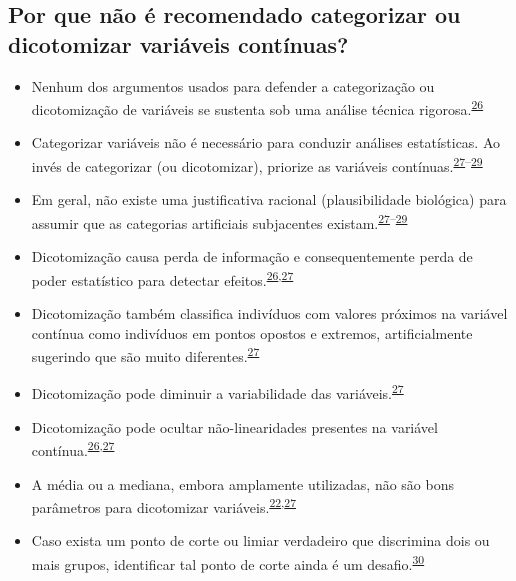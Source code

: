 \documentclass[
]{book}
\begin{document}
\hypertarget{por-que-nuxe3o-uxe9-recomendado-categorizar-ou-dicotomizar-variuxe1veis-contuxednuas}{%
\subsection{Por que não é recomendado categorizar ou dicotomizar variáveis contínuas?}\label{por-que-nuxe3o-uxe9-recomendado-categorizar-ou-dicotomizar-variuxe1veis-contuxednuas}}

\begin{itemize}
\item
  Nenhum dos argumentos usados para defender a categorização ou dicotomização de variáveis se sustenta sob uma análise técnica rigorosa.\textsuperscript{\protect\hyperlink{ref-MacCallum2002}{26}}
\item
  Categorizar variáveis não é necessário para conduzir análises estatísticas. Ao invés de categorizar (ou dicotomizar), priorize as variáveis contínuas.\textsuperscript{\protect\hyperlink{ref-Altman2006}{27}--\protect\hyperlink{ref-Collins2016}{29}}
\item
  Em geral, não existe uma justificativa racional (plausibilidade biológica) para assumir que as categorias artificiais subjacentes existam.\textsuperscript{\protect\hyperlink{ref-Altman2006}{27}--\protect\hyperlink{ref-Collins2016}{29}}
\item
  Dicotomização causa perda de informação e consequentemente perda de poder estatístico para detectar efeitos.\textsuperscript{\protect\hyperlink{ref-MacCallum2002}{26},\protect\hyperlink{ref-Altman2006}{27}}
\item
  Dicotomização também classifica indivíduos com valores próximos na variável contínua como indivíduos em pontos opostos e extremos, artificialmente sugerindo que são muito diferentes.\textsuperscript{\protect\hyperlink{ref-Altman2006}{27}}
\item
  Dicotomização pode diminuir a variabilidade das variáveis.\textsuperscript{\protect\hyperlink{ref-Altman2006}{27}}
\item
  Dicotomização pode ocultar não-linearidades presentes na variável contínua.\textsuperscript{\protect\hyperlink{ref-MacCallum2002}{26},\protect\hyperlink{ref-Altman2006}{27}}
\item
  A média ou a mediana, embora amplamente utilizadas, não são bons parâmetros para dicotomizar variáveis.\textsuperscript{\protect\hyperlink{ref-Fedorov2009}{22},\protect\hyperlink{ref-Altman2006}{27}}
\item
  Caso exista um ponto de corte ou limiar verdadeiro que discrimina dois ou mais grupos, identificar tal ponto de corte ainda é um desafio.\textsuperscript{\protect\hyperlink{ref-Prince2017}{30}}
\end{itemize}
\end{document}
